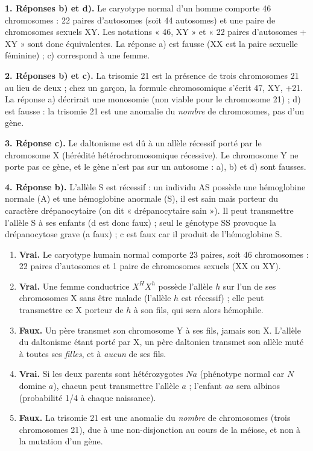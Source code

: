 \documentclass[11pt]{article}
\newcommand{\cle}[1]{{\popxbold\color{popdark}#1}}
\begin{document}
\begin{corrige}
\textbf{1. Réponses b) et d).} Le caryotype normal d'un homme comporte 46 chromosomes : 22 paires d'autosomes (soit 44 autosomes) et une paire de chromosomes sexuels XY. Les notations « 46, XY » et « 22 paires d'autosomes + XY » sont donc équivalentes. La réponse a) est fausse (XX est la paire sexuelle féminine) ; c) correspond à une femme.

\textbf{2. Réponses b) et c).} La trisomie 21 est la présence de \cle{trois chromosomes 21} au lieu de deux ; chez un garçon, la formule chromosomique s'écrit 47, XY, +21. La réponse a) décrirait une monosomie (non viable pour le chromosome 21) ; d) est fausse : la trisomie 21 est une anomalie du \emph{nombre} de chromosomes, pas d'un gène.

\textbf{3. Réponse c).} Le daltonisme est dû à un allèle récessif porté par le chromosome X (hérédité hétérochromosomique récessive). Le chromosome Y ne porte pas ce gène, et le gène n'est pas sur un autosome : a), b) et d) sont fausses.

\textbf{4. Réponse b).} L'allèle S est récessif : un individu AS possède une hémoglobine normale (A) et une hémoglobine anormale (S), il est sain mais \cle{porteur du caractère drépanocytaire} (on dit « drépanocytaire sain »). Il peut transmettre l'allèle S à ses enfants (d est donc faux) ; seul le génotype SS provoque la drépanocytose grave (a faux) ; c est faux car il produit de l'hémoglobine S.
\end{corrige}

\begin{corrige}
\begin{enumerate}
\item \textbf{Vrai.} Le caryotype humain normal comporte 23 paires, soit 46 chromosomes : 22 paires d'autosomes et 1 paire de chromosomes sexuels (XX ou XY).
\item \textbf{Vrai.} Une femme conductrice $X^{H}X^{h}$ possède l'allèle $h$ sur l'un de ses chromosomes X sans être malade (l'allèle $h$ est récessif) ; elle peut transmettre ce X porteur de $h$ à son fils, qui sera alors hémophile.
\item \textbf{Faux.} Un père transmet son chromosome Y à ses fils, jamais son X. L'allèle du daltonisme étant porté par X, un père daltonien transmet son allèle muté à toutes ses \emph{filles}, et à \emph{aucun} de ses fils.
\item \textbf{Vrai.} Si les deux parents sont hétérozygotes $Na$ (phénotype normal car $N$ domine $a$), chacun peut transmettre l'allèle $a$ ; l'enfant $aa$ sera albinos (probabilité 1/4 à chaque naissance).
\item \textbf{Faux.} La trisomie 21 est une anomalie du \emph{nombre} de chromosomes (trois chromosomes 21), due à une non-disjonction au cours de la méiose, et non à la mutation d'un gène.
\end{enumerate}
\end{corrige}
\end{document}
